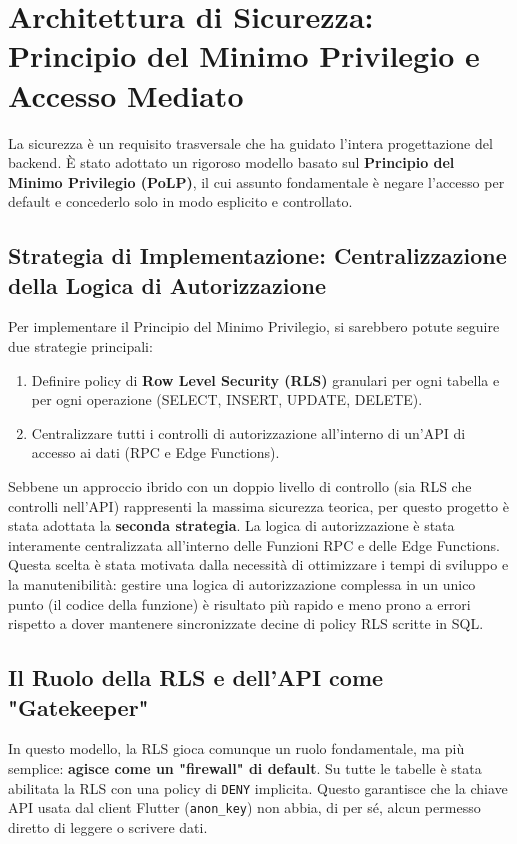 \section{Architettura di Sicurezza: Principio del Minimo Privilegio e Accesso Mediato}\label{sec:architettura-di-sicurezza:-principio-del-minimo-privilegio-e-accesso-mediato}
La sicurezza è un requisito trasversale che ha guidato l'intera progettazione del backend.
È stato adottato un rigoroso modello basato sul \textbf{Principio del Minimo Privilegio (PoLP)}, il cui assunto fondamentale è negare l'accesso per default e concederlo solo in modo esplicito e controllato.

\subsection{Strategia di Implementazione: Centralizzazione della Logica di Autorizzazione}\label{subsec:strategia-di-implementazione:-centralizzazione-della-logica-di-autorizzazione}
Per implementare il Principio del Minimo Privilegio, si sarebbero potute seguire due strategie principali:
\begin{enumerate}
    \item Definire policy di \textbf{Row Level Security (RLS)} granulari per ogni tabella e per ogni operazione (SELECT, INSERT, UPDATE, DELETE).
    \item Centralizzare tutti i controlli di autorizzazione all'interno di un'API di accesso ai dati (RPC e Edge Functions).
\end{enumerate}

Sebbene un approccio ibrido con un doppio livello di controllo (sia RLS che controlli nell'API) rappresenti la massima sicurezza teorica, per questo progetto è stata adottata la \textbf{seconda strategia}.
La logica di autorizzazione è stata interamente centralizzata all'interno delle Funzioni RPC e delle Edge Functions.
Questa scelta è stata motivata dalla necessità di ottimizzare i tempi di sviluppo e la manutenibilità: gestire una logica di autorizzazione complessa in un unico punto (il codice della funzione) è risultato più rapido e meno prono a errori rispetto a dover mantenere sincronizzate decine di policy RLS scritte in SQL.

\subsection{Il Ruolo della RLS e dell'API come "Gatekeeper"}\label{subsec:il-ruolo-della-rls-e-dell'api-come-gatekeeper}
In questo modello, la RLS gioca comunque un ruolo fondamentale, ma più semplice: \textbf{agisce come un "firewall" di default}.
Su tutte le tabelle è stata abilitata la RLS con una policy di \texttt{DENY} implicita.
Questo garantisce che la chiave API usata dal client Flutter (\texttt{anon\_key}) non abbia, di per sé, alcun permesso diretto di leggere o scrivere dati.

